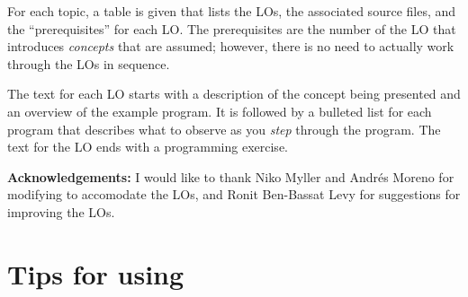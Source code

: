 For each topic, a table is given that lists the LOs, the associated source 
files, and the ``prerequisites'' for each LO. The prerequisites are the number
of the LO that introduces \emph{concepts} that are assumed;
however, there is no need to actually work through the LOs in sequence.

The text for each LO starts with a description of the concept being presented 
and an overview of the example program. It is followed by a bulleted list for 
each program that describes what to observe as you \emph{step} through the 
program. The text for the LO ends with a programming exercise.

\vspace*{3ex}

\textbf{Acknowledgements:} I would like to thank Niko Myller and Andr\'es Moreno
for modifying \jel{} to accomodate the LOs, and Ronit Ben-Bassat Levy for suggestions
for improving the LOs.

\newpage

\section*{Tips for using \jel{}}

